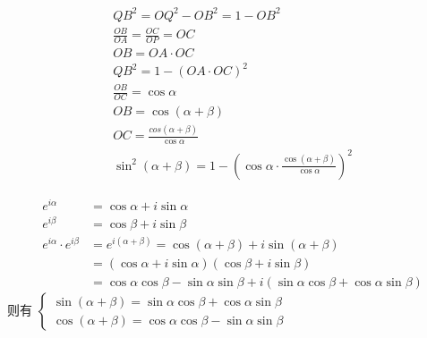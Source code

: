 \documentclass[answers]{exam}
\begin{document}
\begin{questions}
\begin{solution}
\begin{itemize}
\begin{minipage}{0.53\textwidth}
\begin{tikzpicture}[scale=2]
				      \end{tikzpicture}
			      \end{minipage}
			      \begin{minipage}{0.4\textwidth}
				      \begin{gather*}
					      QB^2 = OQ^2 - OB^2 = 1 - OB^2 \\
					      \frac{OB}{OA} = \frac{OC}{OP} = OC \\
					      OB = OA \cdot OC \\
					      QB^2 = 1 - (OA \cdot OC)^2 \\
					      \frac{OB}{OC} = \cos\alpha \\
					      OB = \cos(\alpha + \beta) \\
					      OC = \frac{cos(\alpha + \beta)}{\cos\alpha}\\
					      \sin^2(\alpha+\beta) = 1 - (\cos\alpha \cdot \frac{\cos(\alpha + \beta)}{\cos\alpha})^2
				      \end{gather*}
			      \end{minipage}
			      \begin{align*}
				      e^{i\alpha}                  & = \cos\alpha + i\sin\alpha                                                                 \\
				      e^{i\beta}                   & = \cos\beta + i\sin\beta                                                                   \\
				      e^{i\alpha} \cdot e^{i\beta} & = e^{i(\alpha + \beta)} = \cos(\alpha + \beta) + i\sin(\alpha + \beta)                     \\
				                                   & = (\cos\alpha + i\sin\alpha)(\cos\beta + i\sin\beta)                                       \\
				                                   & = \cos\alpha\cos\beta - \sin\alpha\sin\beta + i(\sin\alpha\cos\beta + \cos\alpha\sin\beta)
			      \end{align*}
			      则有
			      \begin{math}
				      \begin{cases}
					      \sin(\alpha + \beta) = \sin\alpha\cos\beta + \cos\alpha\sin\beta \\
					      \cos(\alpha + \beta) = \cos\alpha\cos\beta - \sin\alpha\sin\beta
				      \end{cases}
			      \end{math}
		\end{itemize}

	\end{solution}
\end{questions}
\end{document}
